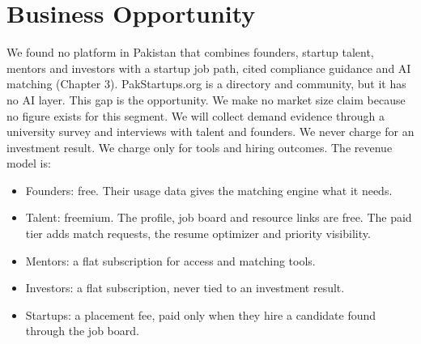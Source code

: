 \documentclass{FastFyp}
\begin{document}
\section{Business Opportunity}
We found no platform in Pakistan that combines founders, startup talent, mentors and investors with a startup job path, cited compliance guidance and AI matching (Chapter 3). PakStartups.org is a directory and community, but it has no AI layer. This gap is the opportunity. We make no market size claim because no figure exists for this segment. We will collect demand evidence through a university survey and interviews with talent and founders. We never charge for an investment result. We charge only for tools and hiring outcomes. The revenue model is:
\begin{itemize}
\item Founders: free. Their usage data gives the matching engine what it needs.
\item Talent: freemium. The profile, job board and resource links are free. The paid tier adds match requests, the resume optimizer and priority visibility.
\item Mentors: a flat subscription for access and matching tools.
\item Investors: a flat subscription, never tied to an investment result.
\item Startups: a placement fee, paid only when they hire a candidate found through the job board.
\end{itemize}
\end{document}

